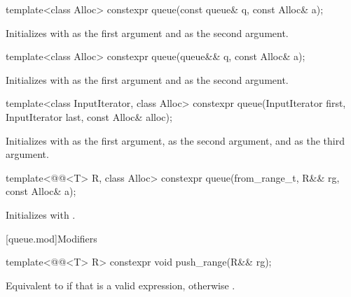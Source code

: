 %
\begin{itemdecl}
template<class Alloc> constexpr queue(const queue& q, const Alloc& a);
\end{itemdecl}

\begin{itemdescr}
\pnum
\effects
Initializes  with  as the first argument and  as the
second argument.
\end{itemdescr}

%
\begin{itemdecl}
template<class Alloc> constexpr queue(queue&& q, const Alloc& a);
\end{itemdecl}

\begin{itemdescr}
\pnum
\effects
Initializes  with  as the first argument and 
as the second argument.
\end{itemdescr}

%
\begin{itemdecl}
template<class InputIterator, class Alloc>
  constexpr queue(InputIterator first, InputIterator last, const Alloc& alloc);
\end{itemdecl}

\begin{itemdescr}
\pnum
\effects
Initializes  with
 as the first argument,
 as the second argument, and
 as the third argument.
\end{itemdescr}

%
\begin{itemdecl}
template<@@<T> R, class Alloc>
  constexpr queue(from_range_t, R&& rg, const Alloc& a);
\end{itemdecl}

\begin{itemdescr}
\pnum
\effects
Initializes  with
.
\end{itemdescr}

[queue.mod]{Modifiers}

%
\begin{itemdecl}
template<@@<T> R>
  constexpr void push_range(R&& rg);
\end{itemdecl}

\begin{itemdescr}
\pnum
\effects
Equivalent to 
if that is a valid expression,
otherwise .
\end{itemdescr}

